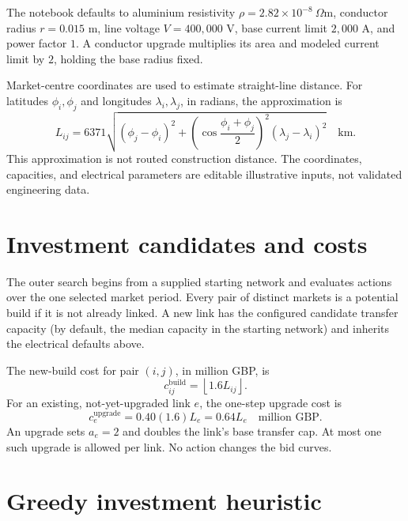 \documentclass[11pt]{article}
\begin{document}
The notebook defaults to aluminium resistivity
\(\rho=2.82\times10^{-8}\ \Omega\mathrm{m}\), conductor radius \(r=0.015\) m,
line voltage \(V=400{,}000\) V, base current limit \(2{,}000\) A, and power
factor \(1\). A conductor upgrade multiplies its area and modeled current limit
by \(2\), holding the base radius fixed.

Market-centre coordinates are used to estimate straight-line distance. For
latitudes \(\phi_i,\phi_j\) and longitudes \(\lambda_i,\lambda_j\), in radians,
the approximation is
\begin{equation}
L_{ij}=6371\sqrt{
(\phi_j-\phi_i)^2+
\left(\cos\frac{\phi_i+\phi_j}{2}\right)^2(\lambda_j-\lambda_i)^2
}\quad\text{km}.
\label{eq:distance}
\end{equation}
This approximation is not routed construction distance. The coordinates,
capacities, and electrical parameters are editable illustrative inputs, not
validated engineering data.

\section{Investment candidates and costs}

The outer search begins from a supplied starting network and evaluates actions
over the one selected market period. Every pair of distinct markets is a
potential build if it is not already linked. A new link has the configured
candidate transfer capacity (by default, the median capacity in the starting
network) and inherits the electrical defaults above.

The new-build cost for pair \((i,j)\), in million GBP, is
\begin{equation}
c^{\mathrm{build}}_{ij}
= \left\lfloor 1.6 L_{ij}\right\rfloor.
\label{eq:build-cost}
\end{equation}
For an existing, not-yet-upgraded link \(e\), the one-step upgrade cost is
\begin{equation}
c^{\mathrm{upgrade}}_e
=0.40(1.6)L_e
=0.64L_e
\quad\text{million GBP}.
\label{eq:upgrade-cost}
\end{equation}
An upgrade sets \(a_e=2\) and doubles the link's base transfer cap. At most one
such upgrade is allowed per link. No action changes the bid curves.

\section{Greedy investment heuristic}
\end{document}
